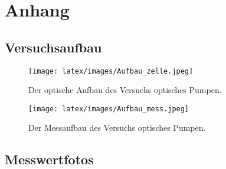 \section{Anhang}

\subsection{Versuchsaufbau}

\begin{figure}[h]
    \centering
    \texttt{[image: latex/images/Aufbau\_zelle.jpeg]}
    \caption{Der optische Aufbau des Versuchs optisches Pumpen.}
    \label{img:aufb_opt}
\end{figure}

\begin{figure}[h]
    \centering
    \texttt{[image: latex/images/Aufbau\_mess.jpeg]}
    \caption{Der Messaufbau des Versuchs optisches Pumpen.}
    \label{img:aufb_mess}
\end{figure}

\subsection{Messwertfotos}